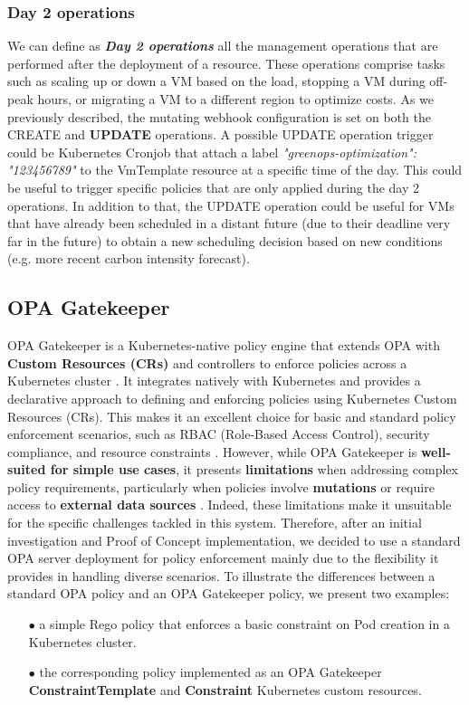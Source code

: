 \subsubsection{Day 2 operations}
\label{sec:day2_operations}

We can define as \textbf{\textit{Day 2 operations}} all the management operations that are performed after the deployment of a resource.
These operations comprise tasks such as scaling up or down a VM based on the load, stopping a VM during off-peak hours, or migrating a VM to a different region to optimize costs.
As we previously described, the mutating webhook configuration is set on both the CREATE and \textbf{UPDATE} operations.
A possible UPDATE operation trigger could be Kubernetes Cronjob that attach a label \textit{"greenops-optimization": "123456789"} to the VmTemplate resource at a specific time of the day.
This could be useful to trigger specific policies that are only applied during the day 2 operations.
In addition to that, the UPDATE operation could be useful for VMs that have already been scheduled in a distant future (due to their deadline very far in the future) to obtain a new scheduling decision based on new conditions (e.g. more recent carbon intensity forecast).

\subsection{OPA Gatekeeper}

OPA Gatekeeper is a Kubernetes-native policy engine that extends OPA with \textbf{Custom Resources (CRs)} and controllers to enforce policies across a Kubernetes cluster \cite{opa_gatekeeper}. 
It integrates natively with Kubernetes and provides a declarative approach to defining and enforcing policies using Kubernetes Custom Resources (CRs). 
This makes it an excellent choice for basic and standard policy enforcement scenarios, such as RBAC (Role-Based Access Control), security compliance, and resource constraints \cite{opa_gatekeeper}.
However, while OPA Gatekeeper is \textbf{well-suited for simple use cases}, it presents \textbf{limitations} when addressing complex policy requirements, particularly when policies involve \textbf{mutations} or require access to \textbf{external data sources} \cite{opa_gatekeeper_external_data}. 
Indeed, these limitations make it unsuitable for the specific challenges tackled in this system. 
Therefore, after an initial investigation and Proof of Concept implementation, we decided to use a standard OPA server deployment for policy enforcement mainly due to the flexibility it provides in handling diverse scenarios.
To illustrate the differences between a standard OPA policy and an OPA Gatekeeper policy, we present two examples:  
\begin{itemize}[itemsep=0.2pt, topsep=1pt]
  \item[$\bullet$] a simple Rego policy that enforces a basic constraint on Pod creation in a Kubernetes cluster.
  \item[$\bullet$] the corresponding policy implemented as an OPA Gatekeeper \textbf{ConstraintTemplate} and \textbf{Constraint} Kubernetes custom resources.
\end{itemize}

